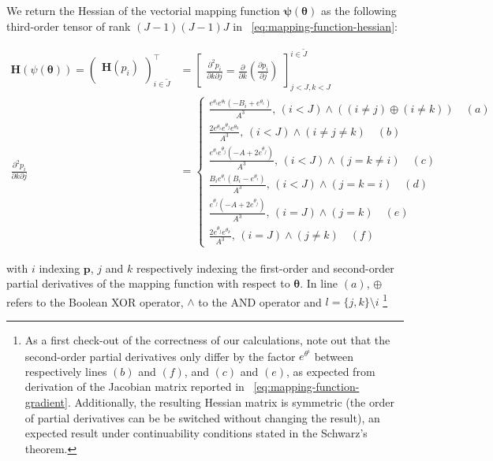 \documentclass[long, final]{jobim}
\begin{document}
We return the Hessian of the vectorial mapping function $\boldsymbol{\psi (\theta)}$ as the following third-order tensor of rank $(J-1)(J-1)J$ in \equationname~\ref{eq:mapping-function-hessian}:


\begin{equation}
    \label{eq:mapping-function-hessian}
    \begin{aligned}
    \mathbf{H} (\psi(\boldsymbol{\theta})) = 
\begin{pmatrix}
 \mathbf{H} (p_i)\\
\end{pmatrix}_{i \in \widetilde{J} }^\top &=
\begin{bmatrix}
\frac{\partial^2 p_i}{\partial k \partial j} = \frac{\partial}{\partial k} \left( \frac{\partial p_i}{\partial j}\right)
\end{bmatrix}_{j < J, k < J}^{i \in \widetilde{J}}\\        
   \frac{\partial^2 p_i}{\partial k \partial j} &=
\begin{cases}
\frac{e^{\theta_i} e^{\theta_l} \left (-B_i + e^{\theta_i}\right)}{A^3},\, (i<J) \land \left((i\neq j) \oplus(i\neq k)\right) \quad (a)\\
\frac{2 e^{\theta_i} e^{\theta_j} e^{\theta_k} }{A^3}, \, (i<J) \land  (i \neq j \neq k)  \quad (b)\\
\frac{e^{\theta_i} e^{\theta_j} \left (-A + 2e^{\theta_j}\right)}{A^3}, \, (i<J) \land (j=k\neq i)  \quad (c)\\
\frac{B_i e^{\theta_i} \left( B_i -  e^{\theta_i}\right)}{A^3}, \, (i<J) \land (j = k = i)  \quad (d)\\
\frac{e^{\theta_j} \left( -A + 2 e^{\theta_j}\right)}{A^3}, \, (i=J) \land (j = k)  \quad (e)\\
\frac{2 e^{\theta_j} e^{\theta_k}}{A^3}, \, (i=J) \land (j \neq k)  \quad (f)
\end{cases}
  \end{aligned}
\end{equation}


with $i$ indexing $\boldsymbol{p}$, $j$ and $k$ respectively indexing the first-order and second-order partial derivatives of the mapping function with respect to $\boldsymbol{\theta}$. In line $(a)$, $\oplus$ refers to the Boolean XOR operator, $\land$ to the AND operator and $l=\{j,k\} \setminus i$ \footnote{As a first check-out of the correctness of our calculations, note out that the second-order partial derivatives only differ by the factor $e^{\theta^i}$ between respectively lines $(b)$ and $(f)$, and $(c)$ and $(e)$, as expected from derivation of the Jacobian matrix reported in \equationname~\ref{eq:mapping-function-gradient}. Additionally, the resulting Hessian matrix is symmetric (the order of partial derivatives can be be switched without changing the result), an expected result under continuability conditions stated in the Schwarz's theorem.}
\end{document}
